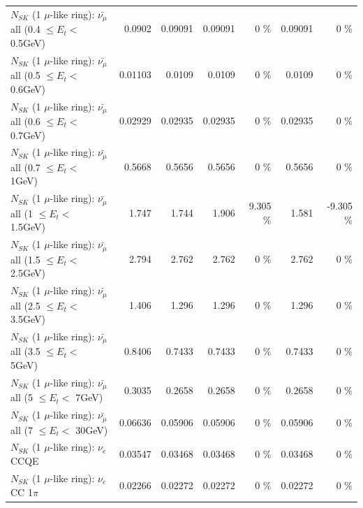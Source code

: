 \begin{table}
\begin{tabular}{| l | r | r | r  r | r  r |}
 $N_{SK}$ (1 $\mu$-like ring): $\bar{\nu_{\mu}}$ all (0.4 $\leq E_{t} <$ 0.5GeV) &          0.0902 &         0.09091 &         0.09091 &        0 \%  &         0.09091 &        0 \%  \\ 
 $N_{SK}$ (1 $\mu$-like ring): $\bar{\nu_{\mu}}$ all (0.5 $\leq E_{t} <$ 0.6GeV) &         0.01103 &          0.0109 &          0.0109 &        0 \%  &          0.0109 &        0 \%  \\ 
 $N_{SK}$ (1 $\mu$-like ring): $\bar{\nu_{\mu}}$ all (0.6 $\leq E_{t} <$ 0.7GeV) &         0.02929 &         0.02935 &         0.02935 &        0 \%  &         0.02935 &        0 \%  \\ 
   $N_{SK}$ (1 $\mu$-like ring): $\bar{\nu_{\mu}}$ all (0.7 $\leq E_{t} <$ 1GeV) &          0.5668 &          0.5656 &          0.5656 &        0 \%  &          0.5656 &        0 \%  \\ 
   $N_{SK}$ (1 $\mu$-like ring): $\bar{\nu_{\mu}}$ all (1 $\leq E_{t} <$ 1.5GeV) &           1.747 &           1.744 &           1.906 &    9.305 \%  &           1.581 &   -9.305 \%  \\ 
 $N_{SK}$ (1 $\mu$-like ring): $\bar{\nu_{\mu}}$ all (1.5 $\leq E_{t} <$ 2.5GeV) &           2.794 &           2.762 &           2.762 &        0 \%  &           2.762 &        0 \%  \\ 
 $N_{SK}$ (1 $\mu$-like ring): $\bar{\nu_{\mu}}$ all (2.5 $\leq E_{t} <$ 3.5GeV) &           1.406 &           1.296 &           1.296 &        0 \%  &           1.296 &        0 \%  \\ 
   $N_{SK}$ (1 $\mu$-like ring): $\bar{\nu_{\mu}}$ all (3.5 $\leq E_{t} <$ 5GeV) &          0.8406 &          0.7433 &          0.7433 &        0 \%  &          0.7433 &        0 \%  \\ 
     $N_{SK}$ (1 $\mu$-like ring): $\bar{\nu_{\mu}}$ all (5 $\leq E_{t} <$ 7GeV) &          0.3035 &          0.2658 &          0.2658 &        0 \%  &          0.2658 &        0 \%  \\ 
    $N_{SK}$ (1 $\mu$-like ring): $\bar{\nu_{\mu}}$ all (7 $\leq E_{t} <$ 30GeV) &         0.06636 &         0.05906 &         0.05906 &        0 \%  &         0.05906 &        0 \%  \\ 
\hline
\hline
\hline
                                      $N_{SK}$ (1 $\mu$-like ring): $\nu_e$ CCQE &         0.03547 &         0.03468 &         0.03468 &        0 \%  &         0.03468 &        0 \%  \\ 
                                 $N_{SK}$ (1 $\mu$-like ring): $\nu_e$ CC 1$\pi$ &         0.02266 &         0.02272 &         0.02272 &        0 \%  &         0.02272 &        0 \%  \\ 

\end{tabular}
\end{table}

